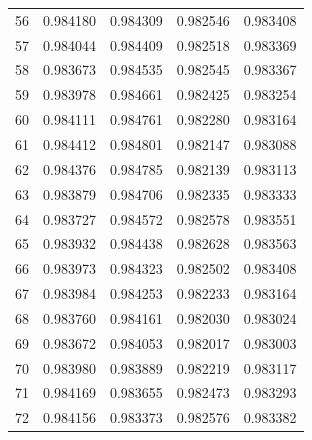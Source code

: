 \begin{table}
\begin{tabular}{rrrrr}
56 & 0.984180 & 0.984309 & 0.982546 & 0.983408 \\
57 & 0.984044 & 0.984409 & 0.982518 & 0.983369 \\
58 & 0.983673 & 0.984535 & 0.982545 & 0.983367 \\
59 & 0.983978 & 0.984661 & 0.982425 & 0.983254 \\
60 & 0.984111 & 0.984761 & 0.982280 & 0.983164 \\
61 & 0.984412 & 0.984801 & 0.982147 & 0.983088 \\
62 & 0.984376 & 0.984785 & 0.982139 & 0.983113 \\
63 & 0.983879 & 0.984706 & 0.982335 & 0.983333 \\
64 & 0.983727 & 0.984572 & 0.982578 & 0.983551 \\
65 & 0.983932 & 0.984438 & 0.982628 & 0.983563 \\
66 & 0.983973 & 0.984323 & 0.982502 & 0.983408 \\
67 & 0.983984 & 0.984253 & 0.982233 & 0.983164 \\
68 & 0.983760 & 0.984161 & 0.982030 & 0.983024 \\
69 & 0.983672 & 0.984053 & 0.982017 & 0.983003 \\
70 & 0.983980 & 0.983889 & 0.982219 & 0.983117 \\
71 & 0.984169 & 0.983655 & 0.982473 & 0.983293 \\
72 & 0.984156 & 0.983373 & 0.982576 & 0.983382 \\
\bottomrule
\end{tabular}
\end{table}
